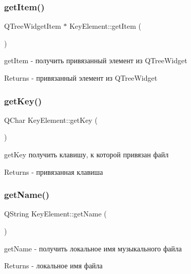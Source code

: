 \subsubsection{\texorpdfstring{get\+Item()}{getItem()}}
{\footnotesize\ttfamily Q\+Tree\+Widget\+Item $\ast$ Key\+Element\+::get\+Item (\begin{DoxyParamCaption}{ }\end{DoxyParamCaption})}



get\+Item -\/ получить привязанный элемент из Q\+Tree\+Widget 

\begin{DoxyReturn}{Returns}
-\/ привязанный элемент из Q\+Tree\+Widget 
\end{DoxyReturn}
\mbox{\label{class_key_element_a6e0591a132b0b7c56196393552e7facd}} 
\subsubsection{\texorpdfstring{get\+Key()}{getKey()}}
{\footnotesize\ttfamily Q\+Char Key\+Element\+::get\+Key (\begin{DoxyParamCaption}{ }\end{DoxyParamCaption})}



get\+Key получить клавишу, к которой привязан файл 

\begin{DoxyReturn}{Returns}
-\/ привязанная клавиша 
\end{DoxyReturn}
\mbox{\label{class_key_element_a30701d7ff9a6ab3ec4ac69c0487f462c}} 
\subsubsection{\texorpdfstring{get\+Name()}{getName()}}
{\footnotesize\ttfamily Q\+String Key\+Element\+::get\+Name (\begin{DoxyParamCaption}{ }\end{DoxyParamCaption})}



get\+Name -\/ получить локальное имя музыкального файла 

\begin{DoxyReturn}{Returns}
-\/ локальное имя файла 
\end{DoxyReturn}
\mbox{\label{class_key_element_a04460e1dedb060dd7c21a7a4ef3a3ee2}} 
